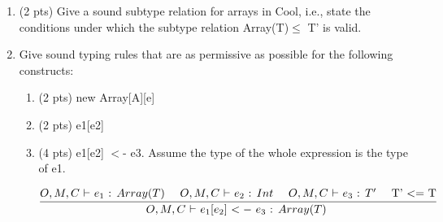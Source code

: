 \documentclass[10pt]{article}
\newcommand{\infertext}[2]{\infer{{\textrm{#1}}}{#2}}
\begin{document}
\begin{enumerate}
\begin{enumerate}
  \item (2 pts) Give a sound subtype relation for arrays in Cool, i.e., state the conditions under which
the subtype relation \textsf{Array(T)$\le$ T'} is valid.
  \item Give sound typing rules that are as permissive as possible for the following constructs:

\begin{enumerate}
    \item (2 pts) \textsf{new Array[A][e]}
    \item (2 pts) \textsf{e1[e2]}
    \item (4 pts) \textsf{e1[e2] $<$- e3}. Assume the type of the whole expression is the type of \textsf{e1}.

    \[\infertext
    {$O,M,C$ $\vdash$ $e_1[e_2]$ $<-$  $e_3$ : $Array(T)$ }
    {\textrm{$O,M,C$ $\vdash$ $e_1$ : $Array(T)$}
    \ \ \ \ 	\textrm{$O,M,C$ $\vdash$ $e_2$ : $Int$}
    \ \ \ \ 	\textrm{$O,M,C$ $\vdash$ $e_3$ : $T'$}
    \ \ \ \   \textrm{T' $<=$ T}
    }
  \]
\end{enumerate}
\end{enumerate}
\end{enumerate}
\end{document}
